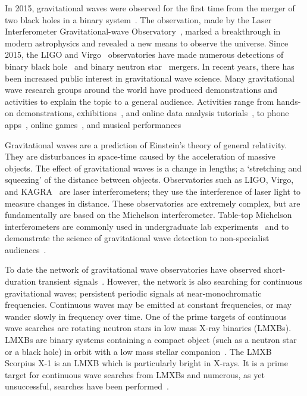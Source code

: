 \documentclass[paper-main.tex]{subfiles}
\begin{document}
In 2015, gravitational waves were observed for the first time from the merger of two black holes in a binary system~\cite{GW150914}. 
The observation, made by the Laser Interferometer Gravitational-wave Observatory~\citep[LIGO]{AdvancedLIGO:2015}, marked a breakthrough in modern astrophysics and revealed a new means to observe the universe. 
Since 2015, the LIGO and Virgo~\cite{AdvancedVirgo:2015} observatories have made numerous detections of binary black hole~\cite{GW151226,GW170104,GW170814} and binary neutron star~\cite{GW170817,GW170817multi,GW190425} mergers. 
In recent years, there has been increased public interest in gravitational wave science. 
Many gravitational wave research groups around the world have produced demonstrations and activities to explain the topic to a general audience.
Activities range from hands-on demonstrations, exhibitions~\cite{TTExhibit:2020,LIGOScienceEducationCentre:online,GravityDiscoveryCentre:online}, and online data analysis tutorials~\cite{GWOSC:online,LOSC:2015}, to phone apps~\cite{LaserLabs:online,SciVR:online,chirp:online}, online games~\cite{BlackHoleHunter:online}, and musical performances~\cite{ArthurJeffesMusic:online,GravitySynthLeonTrimble:online}%

Gravitational waves are a prediction of Einstein's theory of general relativity. 
They are disturbances in space-time caused by the acceleration of massive objects. 
The effect of gravitational waves is a change in lengths; a `stretching and squeezing' of the distance between objects.
Observatories such as LIGO, Virgo, and KAGRA~\cite{KAGRA:2013} are laser interferometers; they use the interference of laser light to measure changes in distance. 
These observatories are extremely complex, but are fundamentally are based on the Michelson interferometer. 
Table-top Michelson interferometers are commonly used in undergraduate lab experiments~\cite{UgoliniEtAl:2019} and to demonstrate the science of gravitational wave detection to non-specialist audiences~\cite{ThorLabsIFO,NikhefIFO,TTExhibit:2020,LIGOIFOGlue,LIGOIFOMagnets}.

To date the network of gravitational wave observatories have observed short-duration transient signals~\cite{GWTC-1:2018,GWOSC:online}. 
However, the network is also searching for continuous gravitational waves; persistent periodic signals at near-monochromatic frequencies.
Continuous waves may be emitted at constant frequencies, or may wander slowly in frequency over time. 
One of the prime targets of continuous wave searches are rotating neutron stars in low mass X-ray binaries (LMXBs).
LMXBs are binary systems containing a compact object (such as a neutron star or a black hole) in orbit with a low mass stellar companion~\cite{xraybinaries:1997}. 
The LMXB Scorpius X-1 is an LMXB which is particularly bright in X-rays. 
It is a prime target for continuous wave searches from LMXBs and numerous, as yet unsuccessful, searches have been performed~\cite{ScoX1O2Viterbi:2019,RadiometerO1O2:2019,SearchCrossCorrO1:2017}.
\end{document}
